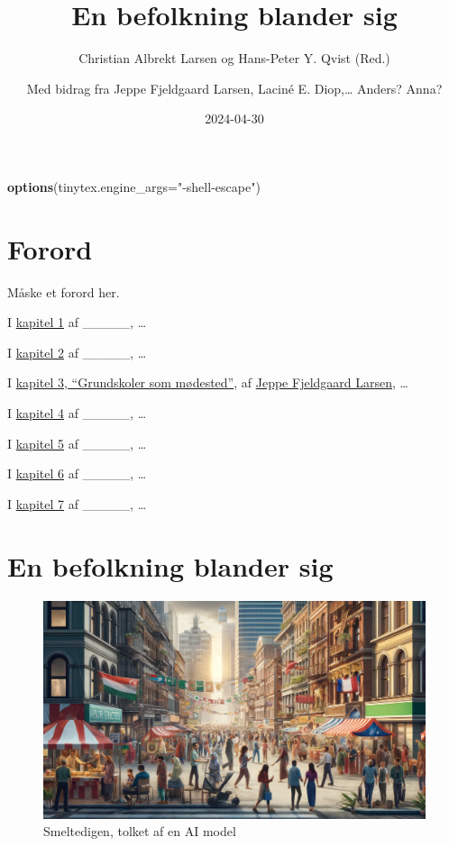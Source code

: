 \documentclass[
]{book}
\title{En befolkning blander sig}
\author{Christian Albrekt Larsen og Hans-Peter Y. Qvist (Red.) \and Med bidrag fra Jeppe Fjeldgaard Larsen, Laciné E. Diop,\ldots{} Anders? Anna?}
\date{2024-04-30}
\newenvironment{Shaded}{\begin{snugshade}}{\end{snugshade}}
\newcommand{\AttributeTok}[1]{\textcolor[rgb]{0.13,0.29,0.53}{#1}}
\newcommand{\FunctionTok}[1]{\textcolor[rgb]{0.13,0.29,0.53}{\textbf{#1}}}
\newcommand{\NormalTok}[1]{#1}
\newcommand{\StringTok}[1]{\textcolor[rgb]{0.31,0.60,0.02}{#1}}
\begin{document}
\maketitle

{
\setcounter{tocdepth}{1}
\tableofcontents
}
\begin{Shaded}
\begin{Highlighting}[]
\FunctionTok{options}\NormalTok{(}\AttributeTok{tinytex.engine\_args=}\StringTok{"{-}shell{-}escape"}\NormalTok{)}
\end{Highlighting}
\end{Shaded}

\hypertarget{forord}{%
\chapter*{Forord}\label{forord}}

Måske et forord her.

I \protect\hyperlink{kap1}{kapitel 1} af \_\_\_\_\_, \ldots{}

I \protect\hyperlink{kap2}{kapitel 2} af \_\_\_\_\_, \ldots{}

I \protect\hyperlink{kap3}{kapitel 3, ``Grundskoler som mødested''}, af \href{https://vbn.aau.dk/da/persons/140717}{Jeppe Fjeldgaard Larsen}, \ldots{}

I \protect\hyperlink{kap4}{kapitel 4} af \_\_\_\_\_, \ldots{}

I \protect\hyperlink{kap5}{kapitel 5} af \_\_\_\_\_, \ldots{}

I \protect\hyperlink{kap6}{kapitel 6} af \_\_\_\_\_, \ldots{}

I \protect\hyperlink{kap7}{kapitel 7} af \_\_\_\_\_, \ldots{}

\hypertarget{kap1}{%
\chapter{En befolkning blander sig}\label{kap1}}

\begin{figure}
\includegraphics[width=1\linewidth]{images/dalle-smeltedige} \caption{Smeltedigen, tolket af en AI model}\label{fig:fig-smelte}
\end{figure}
\end{document}
